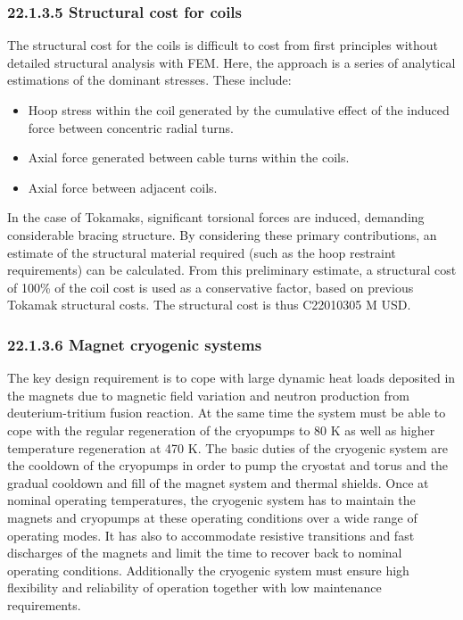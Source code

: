 \subsubsection*{22.1.3.5 Structural cost for coils}

The structural cost for the coils is difficult to cost from first principles without detailed structural analysis with FEM. Here, the approach is a series of analytical estimations of the dominant stresses. These include:

\begin{itemize}
    \item Hoop stress within the coil generated by the cumulative effect of the induced force between concentric radial turns.
    \item Axial force generated between cable turns within the coils.
    \item Axial force between adjacent coils.
\end{itemize}


In the case of Tokamaks, significant torsional forces are induced, demanding considerable bracing structure. By considering these primary contributions, an estimate of the structural material required (such as the hoop restraint requirements) can be calculated. From this preliminary estimate, a structural cost of 100\% of the coil cost is used as a conservative factor, based on previous Tokamak structural costs. The structural cost is thus C22010305 M USD.


\subsubsection*{22.1.3.6 Magnet cryogenic systems}

The key design requirement is to cope with large dynamic heat loads deposited in the
magnets due to magnetic field variation and neutron production from deuterium-tritium
fusion reaction. At the same time the system must be able to cope with the regular
regeneration of the cryopumps to 80 K as well as higher temperature regeneration at 470 K.
The basic duties of the cryogenic system are the cooldown of the cryopumps in order
to pump the cryostat and torus and the gradual cooldown and fill of the magnet system and
thermal shields. Once at nominal operating temperatures, the cryogenic system has to
maintain the magnets and cryopumps at these operating conditions over a wide range of
operating modes. It has also to accommodate resistive transitions and fast discharges of the
magnets and limit the time to recover back to nominal operating conditions. Additionally
the cryogenic system must ensure high flexibility and reliability of operation together with
low maintenance requirements.

